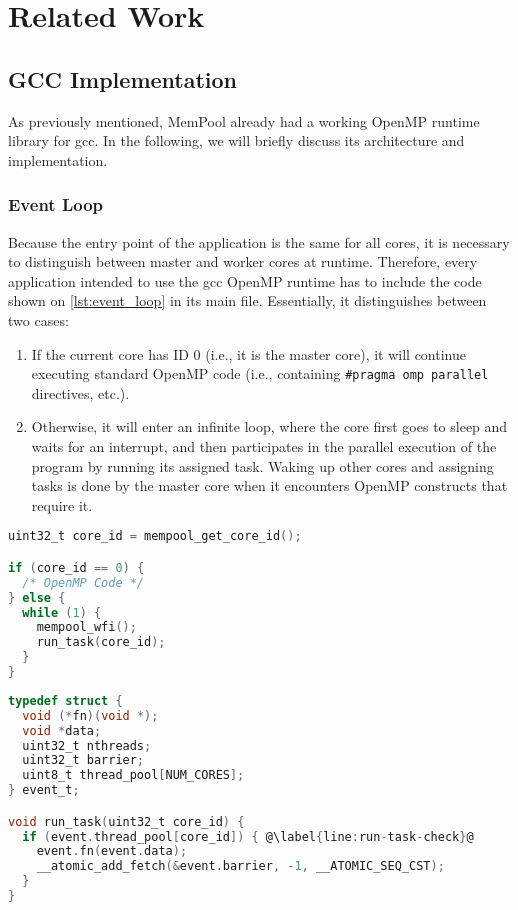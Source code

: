 \chapter{Related Work}
\label{ch:related_work}

\section{GCC Implementation}
\label{sec:gcc_implementation}

As previously mentioned, MemPool already had a working OpenMP runtime library for \gls{gcc}. In the
following, we will briefly discuss its architecture and implementation.

\subsection{Event Loop}
\label{subsec:event_loop}

Because the entry point of the application is the same for all cores, it is necessary to distinguish
between master and worker cores at runtime. Therefore, every application intended to use the
\gls{gcc} OpenMP runtime has to include the code shown on \cref{lst:event_loop} in its main file.
Essentially, it distinguishes between two cases:

\begin{enumerate}
	\item If the current core has ID 0 (i.e., it is the master core), it will continue executing
	      standard OpenMP code (i.e., containing \texttt{\#pragma omp parallel} directives, etc.).
	\item Otherwise, it will enter an infinite loop, where the core first goes to sleep and waits
	      for an interrupt, and then participates in the parallel execution of the program by
	      running its assigned task. Waking up other cores and assigning tasks is done by the
	      master core when it encounters OpenMP constructs that require it.
\end{enumerate}

\begin{lstlisting}[language=C, caption={Main Event Loop}, label={lst:event_loop}]
uint32_t core_id = mempool_get_core_id();

if (core_id == 0) {
  /* OpenMP Code */
} else {
  while (1) {
    mempool_wfi();
    run_task(core_id);
  }
}
\end{lstlisting}

\begin{lstlisting}[language=C, caption={run\_task Implementation}, label={lst:run-task},
                   escapechar=@]
typedef struct {
  void (*fn)(void *);
  void *data;
  uint32_t nthreads;
  uint32_t barrier;
  uint8_t thread_pool[NUM_CORES];
} event_t;

void run_task(uint32_t core_id) {
  if (event.thread_pool[core_id]) { @\label{line:run-task-check}@
    event.fn(event.data);
    __atomic_add_fetch(&event.barrier, -1, __ATOMIC_SEQ_CST);
  }
}
\end{lstlisting}

